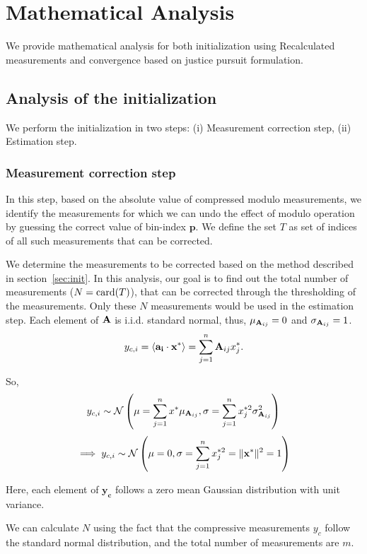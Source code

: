 \section{Mathematical Analysis}
We provide mathematical analysis for both initialization using Recalculated measurements and convergence based on justice pursuit formulation. 
\subsection{Analysis of the initialization}
We perform the initialization in two steps:
(i) Measurement correction step, (ii) Estimation step.

\subsubsection{Measurement correction step}\label{meascorr}In this step, based on the absolute value of compressed modulo measurements, we identify the measurements for which we can undo the effect of modulo operation by guessing the correct value of bin-index $\mathbf{p}$. We define the set $T$ as set of indices of all such measurements that can be corrected.

We determine the measurements to be corrected based on the method described in section~\ref{sec:init}. 
In this analysis, our goal is to find out the total number of measurements ($N=\mathrm{card}(T)$), that can be corrected through the thresholding of the measurements. Only these $N$ measurements would be used in the estimation step.
Each element of $\mathbf{A}$ is i.i.d. standard normal, thus, $\mu_{\mathbf{A}_{ij}} = 0$ and $\sigma_{\mathbf{A}_{ij}}=1$.
$$
y_{c,i} =\langle \mathbf{a_i} \cdot \mathbf{x^*} \rangle = \sum_{j=1}^{n}\mathbf{A}_{ij}x^*_{j}.
$$

So, 
$$
y_{c,i} \sim \mathcal{N}\left(\mu= \sum_{j=1}^{n}x^{*}\mu_{\mathbf{A}_{ij}}, \sigma =\sum_{j=1}^{n}x^{*2}_{j}\sigma^2_{\mathbf{A}_{ij}}\right)
$$
$$
\implies y_{c,i} \sim \mathcal{N}\left(\mu= 0, \sigma =\sum_{j=1}^{n}x^{*2}_{j} = \|\mathbf{{x}^*}\|^2 = 1 \right)
$$

Here, each element of $\mathbf{y_c}$ follows a zero mean Gaussian distribution with unit variance.

We can calculate $N$ using the fact that the compressive measurements $y_c$ follow the standard normal distribution, and the total number of measurements are $m$.

